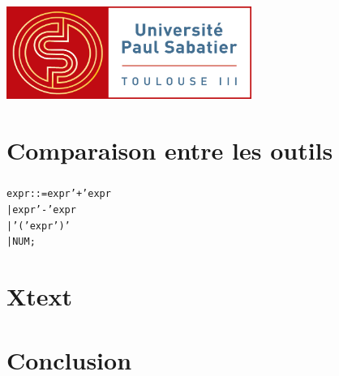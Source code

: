 \documentclass{beamer}
\begin{document}
\begin{frame}[fragile]\frametitle{}

		\includegraphics[width=0.60\textwidth]{logo-ups.jpg}
\end{frame}


\section{Comparaison entre les outils}


\begin{frame}[fragile]\frametitle{}

\begin{alltt}
expr ::= expr '+' expr
      | expr '-' expr
      | '(' expr ')'
      | NUM ;
\end{alltt}

\end{frame}


\section{Xtext}


\begin{frame}[fragile]\frametitle{}

\end{frame}


\section{Conclusion}


\begin{frame}[fragile]\frametitle{}

\end{frame}
\end{document}
